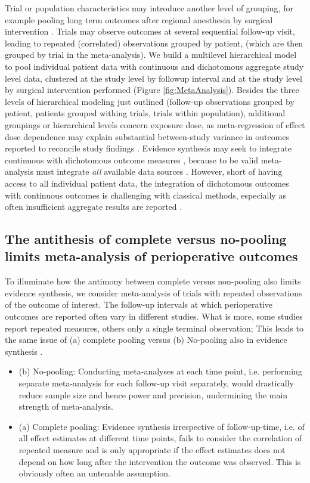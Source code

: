 \documentclass[11pt,notitlepage]{article}
\begin{document}
Trial or population characteristics may introduce another level of grouping, for example pooling long term outcomes after regional anesthesia by surgical intervention \cite{Andreae2013,Abroug2011}. Trials may observe outcomes at several sequential follow-up visit, leading to repeated (correlated) observations grouped by patient, (which are then grouped by trial in the  meta-analysis).  We build a multilevel hierarchical model to pool individual patient data with continuous and dichotomous aggregate study level data, clustered at the study level by followup interval and at the study level by surgical intervention performed (Figure \ref{fig:MetaAnalysis}). Besides the three levels of hierarchical modeling just outlined (follow-up observations grouped by patient, patients grouped withing trials, trials within population), additional groupings or hierarchical levels concern exposure dose, as meta-regression of effect dose dependence may explain substantial between-study variance in outcomes reported to reconcile study findings \cite{Andreae2015}. Evidence synthesis may seek to integrate continuous with dichotomous outcome measures \cite{AndreaeJohnsonAbstract2013}, because to be valid meta-analysis must integrate \textit{all} available data sources \cite{Deeks2011chapter}. However, short of having access to all individual patient data, the integration of dichotomous outcomes with continuous outcomes is challenging with classical methods\cite{Andreae2015}, especially as often insufficient aggregate results are reported \cite{Roth2015CriticalCare}. 

\subsection*{The antithesis of complete versus no-pooling limits meta-analysis of perioperative outcomes}
To illuminate how the antimony between complete versus non-pooling also limits evidence synthesis, we consider meta-analysis of trials with repeated observations of the outcome of interest. The follow-up intervals at which perioperative outcomes are reported often vary in different studies. What is more, some studies report repeated measures, others only a single terminal observation; This leads to the same issue of (a) complete pooling versus (b) No-pooling also in evidence synthesis \cite{Roth2015CriticalCare}.

\begin{itemize}
\item (b) No-pooling: 
Conducting meta-analyses at each time point, i.e. performing separate meta-analysis for each follow-up visit separately, would drastically reduce sample size and hence power and precision, undermining the main strength of meta-analysis.
\item (a) Complete pooling:
Evidence synthesis irrespective of follow-up-time, i.e. of all effect estimates at different time points, fails to consider the correlation of repeated measure and is only appropriate if the effect estimates does not depend on how long after the intervention the outcome was observed. This is obviously often an untenable assumption.
\end{itemize}
\end{document}
